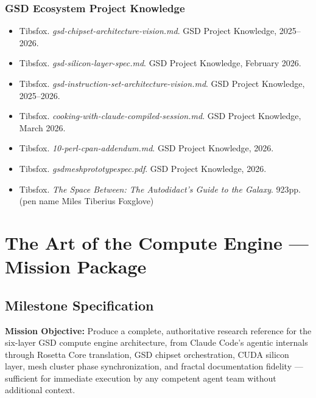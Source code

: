 \documentclass[11pt,letterpaper]{article}
\newcommand{\stageheader}[2]{%
  \noindent\colorbox{#2}{\makebox[\textwidth][l]{%
    \textcolor{white}{\bfseries\sffamily\hspace{6pt}#1\hspace{6pt}}}}%
  \vspace{0.5em}\par%
}
\begin{document}
\subsubsection{GSD Ecosystem Project Knowledge}
\begin{itemize}[leftmargin=1.5em]
  \item Tibsfox. \textit{gsd-chipset-architecture-vision.md}. GSD Project Knowledge, 2025--2026.
  \item Tibsfox. \textit{gsd-silicon-layer-spec.md}. GSD Project Knowledge, February 2026.
  \item Tibsfox. \textit{gsd-instruction-set-architecture-vision.md}. GSD Project Knowledge, 2025--2026.
  \item Tibsfox. \textit{cooking-with-claude-compiled-session.md}. GSD Project Knowledge, March 2026.
  \item Tibsfox. \textit{10-perl-cpan-addendum.md}. GSD Project Knowledge, 2026.
  \item Tibsfox. \textit{gsdmeshprototypespec.pdf}. GSD Project Knowledge, 2026.
  \item Tibsfox. \textit{The Space Between: The Autodidact's Guide to the Galaxy}. 923pp. (pen name Miles Tiberius Foxglove)
\end{itemize}

\newpage

\stageheader{STAGE 3 --- MISSION PACKAGE}{tertiary}

\section{The Art of the Compute Engine --- Mission Package}

\subsection{Milestone Specification}

\textbf{Mission Objective:} Produce a complete, authoritative research reference for the six-layer GSD compute engine architecture, from Claude Code's agentic internals through Rosetta Core translation, GSD chipset orchestration, CUDA silicon layer, mesh cluster phase synchronization, and fractal documentation fidelity --- sufficient for immediate execution by any competent agent team without additional context.
\end{document}
